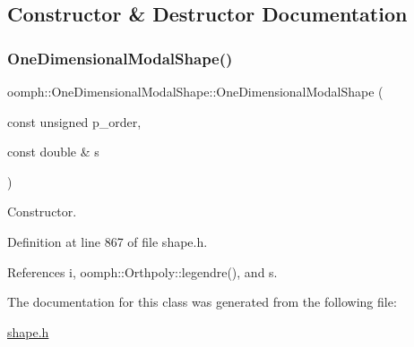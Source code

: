 \subsection{Constructor \& Destructor Documentation}
\mbox{\label{classoomph_1_1OneDimensionalModalShape_ad0c78c7f241de32135be0b126a3e6a16}} 
\subsubsection{\texorpdfstring{One\+Dimensional\+Modal\+Shape()}{OneDimensionalModalShape()}}
{\footnotesize\ttfamily oomph\+::\+One\+Dimensional\+Modal\+Shape\+::\+One\+Dimensional\+Modal\+Shape (\begin{DoxyParamCaption}\item[{const unsigned}]{p\+\_\+order,  }\item[{const double \&}]{s }\end{DoxyParamCaption})\hspace{0.3cm}{\ttfamily [inline]}}



Constructor. 



Definition at line 867 of file shape.\+h.



References i, oomph\+::\+Orthpoly\+::legendre(), and s.



The documentation for this class was generated from the following file\+:\begin{DoxyCompactItemize}
\item 
\hyperlink{shape_8h}{shape.\+h}\end{DoxyCompactItemize}
